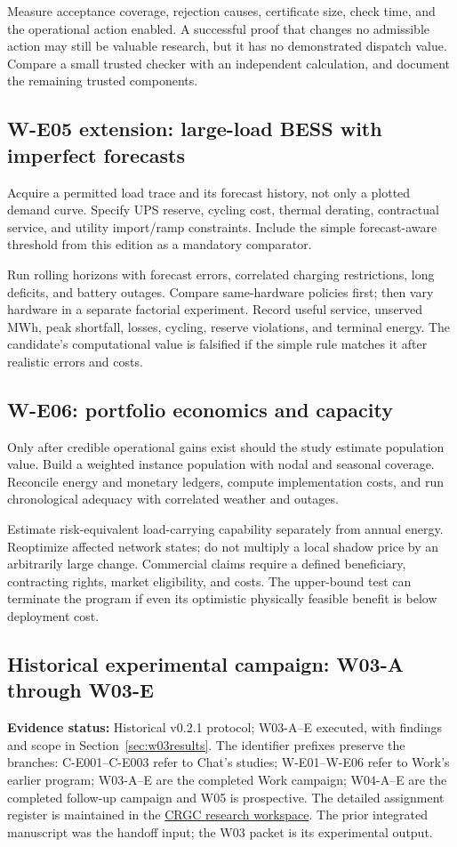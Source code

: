 \documentclass[11pt,letterpaper]{article}
\newcommand{\status}[1]{\textbf{Evidence status:} #1}
\begin{document}
Measure acceptance coverage, rejection causes, certificate size, check time, and the operational action enabled. A successful proof that changes no admissible action may still be valuable research, but it has no demonstrated dispatch value. Compare a small trusted checker with an independent calculation, and document the remaining trusted components.

\subsection{W-E05 extension: large-load BESS with imperfect forecasts}
Acquire a permitted load trace and its forecast history, not only a plotted demand curve. Specify UPS reserve, cycling cost, thermal derating, contractual service, and utility import/ramp constraints. Include the simple forecast-aware threshold from this edition as a mandatory comparator.

Run rolling horizons with forecast errors, correlated charging restrictions, long deficits, and battery outages. Compare same-hardware policies first; then vary hardware in a separate factorial experiment. Record useful service, unserved MWh, peak shortfall, losses, cycling, reserve violations, and terminal energy. The candidate's computational value is falsified if the simple rule matches it after realistic errors and costs.

\subsection{W-E06: portfolio economics and capacity}
Only after credible operational gains exist should the study estimate population value. Build a weighted instance population with nodal and seasonal coverage. Reconcile energy and monetary ledgers, compute implementation costs, and run chronological adequacy with correlated weather and outages.

Estimate risk-equivalent load-carrying capability separately from annual energy. Reoptimize affected network states; do not multiply a local shadow price by an arbitrarily large change. Commercial claims require a defined beneficiary, contracting rights, market eligibility, and costs. The upper-bound test can terminate the program if even its optimistic physically feasible benefit is below deployment cost.

\subsection{Historical experimental campaign: W03-A through W03-E}
\label{sec:w03}
\status{Historical v0.2.1 protocol; W03-A--E executed, with findings and scope in Section~\ref{sec:w03results}.} The identifier prefixes preserve the branches: C-E001--C-E003 refer to Chat's studies; W-E01--W-E06 refer to Work's earlier program; W03-A--E are the completed Work campaign; W04-A--E are the completed follow-up campaign and W05 is prospective. The detailed assignment register is maintained in the \href{https://chatgpt.com/space/page_dfa9a6f1ac5081919df0487eb77df505}{CRGC research workspace}. The prior integrated manuscript was the handoff input; the W03 packet is its experimental output.
\end{document}
